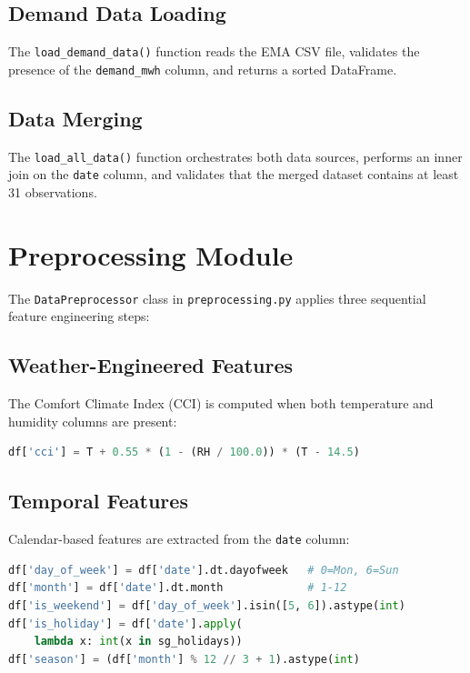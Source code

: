 \subsection{Demand Data Loading}

The \texttt{load\_demand\_data()} function reads the EMA CSV file, validates the presence of the \texttt{demand\_mwh} column, and returns a sorted DataFrame.

\subsection{Data Merging}

The \texttt{load\_all\_data()} function orchestrates both data sources, performs an inner join on the \texttt{date} column, and validates that the merged dataset contains at least 31 observations.


\section{Preprocessing Module}\label{sec:preprocessing_impl}

The \texttt{DataPreprocessor} class in \texttt{preprocessing.py} applies three sequential feature engineering steps:

\subsection{Weather-Engineered Features}

The Comfort Climate Index (CCI) is computed when both temperature and humidity columns are present:
\begin{lstlisting}[language=Python, caption={CCI computation.}, label={lst:cci}]
df['cci'] = T + 0.55 * (1 - (RH / 100.0)) * (T - 14.5)
\end{lstlisting}

\subsection{Temporal Features}

Calendar-based features are extracted from the \texttt{date} column:
\begin{lstlisting}[language=Python, caption={Temporal feature extraction.}, label={lst:temporal}]
df['day_of_week'] = df['date'].dt.dayofweek   # 0=Mon, 6=Sun
df['month'] = df['date'].dt.month             # 1-12
df['is_weekend'] = df['day_of_week'].isin([5, 6]).astype(int)
df['is_holiday'] = df['date'].apply(
    lambda x: int(x in sg_holidays))
df['season'] = (df['month'] % 12 // 3 + 1).astype(int)
\end{lstlisting}

